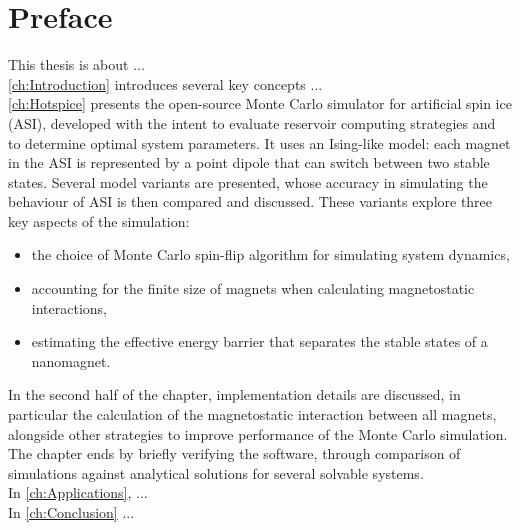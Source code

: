 \chapter*{Preface}

This thesis is about ... \\

\cref{ch:Introduction} introduces several key concepts ... \\

\cref{ch:Hotspice} presents the open-source \hotspice Monte Carlo simulator for artificial spin ice (ASI), developed with the intent to evaluate reservoir computing strategies and to determine optimal system parameters.
It uses an Ising-like model: each magnet in the ASI is represented by a point dipole that can switch between two stable states.
Several model variants are presented, whose accuracy in simulating the behaviour of ASI is then compared and discussed.
These variants explore three key aspects of the simulation:
\begin{itemize}[noitemsep,nolistsep] %
	\item the choice of Monte Carlo spin-flip algorithm for simulating system dynamics,
	\item accounting for the finite size of magnets when calculating magnetostatic interactions,
	\item estimating the effective energy barrier that separates the stable states of a nanomagnet.
\end{itemize}
In the second half of the chapter, implementation details are discussed, in particular the calculation of the magnetostatic interaction between all magnets, alongside other strategies to improve performance of the Monte Carlo simulation.
The chapter ends by briefly verifying the software, through comparison of simulations against analytical solutions for several solvable systems. \\

In \cref{ch:Applications}, ... \\

In \cref{ch:Conclusion} ...
